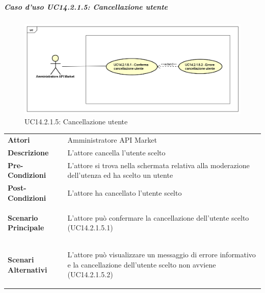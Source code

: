 \newpage
\subparagraph{Caso d'uso UC14.2.1.5: Cancellazione utente}
\label{UC14_2_1_5}
\begin{figure}[ht]
	\centering
	\includegraphics[scale=0.45]{UML/UC14_2_1_5.png}
	\caption{UC14.2.1.5: Cancellazione utente}
\end{figure}

\begin{minipage}{\linewidth}
	\begin{tabular}{ l | p{11cm}}
		\hline
		\rowcolor{Gray}
		\multicolumn{2}{c}{UC14.2.1.5 - Cancellazione utente} \\
		\hline
		\textbf{Attori} & Amministratore API Market \\
		\textbf{Descrizione} & L'attore cancella l'utente scelto \\
		\textbf{Pre-Condizioni} & L'attore si trova nella schermata relativa alla moderazione dell'utenza ed ha scelto un utente \\
		\textbf{Post-Condizioni} & L'attore ha cancellato l'utente scelto \\
		\textbf{Scenario Principale} & 
		\begin{enumerate*}[label=(\arabic*.),itemjoin={\newline}]
			\item L'attore può confermare la cancellazione dell'utente scelto (UC14.2.1.5.1)
		\end{enumerate*}\\
		\textbf{Scenari Alternativi} & 
		\begin{enumerate*}[label=(\arabic*.),itemjoin={\newline}]
			\item L'attore può visualizzare un messaggio di errore informativo e la cancellazione dell'utente scelto non avviene (UC14.2.1.5.2)
		\end{enumerate*}\\
	\end{tabular}
\end{minipage}

